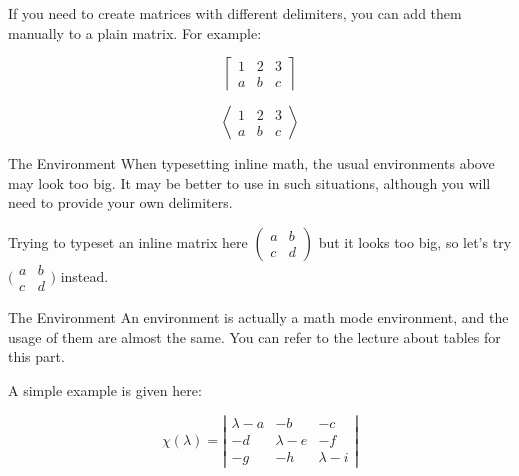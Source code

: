\begin{frame}[fragile]
If you need to create matrices with different delimiters, you can add them manually to a plain matrix. For example:

\begin{latexexamplesplit}
\begin{equation}
  \left\lceil
  \begin{matrix}
    1 & 2 & 3 \\
    a & b & c
    \end{matrix}
  \right\rceil
\end{equation}

\begin{equation}
  \left\langle
  \begin{matrix}
    1 & 2 & 3 \\
    a & b & c
  \end{matrix}
  \right\rangle
\end{equation}
\end{latexexamplesplit}

\end{frame}

\begin{frame}[fragile]{The  Environment}
When typesetting inline math, the usual  environments above may look too big. It may be better to use  in such situations, although you will need to provide your own delimiters.

\begin{latexexample}
Trying to typeset an inline matrix here
$\begin{pmatrix}
  a & b \\ 
  c & d
\end{pmatrix}$ 
but it looks too big, so let's try 
$\big(\begin{smallmatrix}
  a & b \\
  c & d
\end{smallmatrix}\big)$ instead.
\end{latexexample}

\end{frame}

\begin{frame}[fragile]{The  Environment}
An  environment is actually a math mode  environment, and the usage of them are almost the same. You can refer to the lecture about tables for this part. \medskip

A simple example is given here:
\begin{latexexamplesplit}[0.4]
\begin{equation}
  \chi(\lambda) = 
  \left| \begin{array}{ccc}
    \lambda - a & -b & -c \\
    -d & \lambda - e & -f \\
    -g & -h & \lambda - i 
  \end{array} \right|
\end{equation}
\end{latexexamplesplit}

\end{frame}


